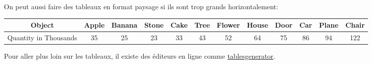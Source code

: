 \documentclass[10pt,a4paper]{article}
\begin{document}
\blindtext[5] %
	
On peut aussi faire des tableaux en format paysage si ils sont trop grands horizontalement:
	
\begin{landscape}
\begin{tabular}{|c|c|c|c|c|c|c|c|c|c|c|c|}\hline

Object & Apple & Banana & Stone & Cake & Tree & Flower & House & Door & Car & Plane & Chair \\ \hline 

Quantity in Thousands & 35  &  25  & 23 & 33 & 43  & 52 & 64 & 75 & 86  & 94  & 122  \\ \hline 

\end{tabular}
\end{landscape}

Pour aller plus loin sur les tableaux, il existe des éditeurs en ligne comme \href{https://www.tablesgenerator.com/latex_tables#}{tablesgenerator}.
	
\end{document}
